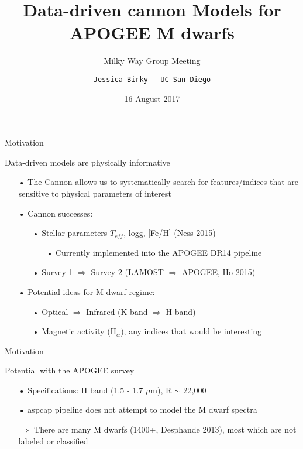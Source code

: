 \documentclass[compress]{beamer}
\title{Data-driven cannon Models for APOGEE M dwarfs}
\subtitle{\textcolor{sthlmDarkGreen}{Milky Way Group Meeting}}
\date{\small{16 August 2017}}
\author{\texttt{Jessica Birky - UC San Diego}}
\institute{\texttt{Advisor: David Hogg - NYU/MPIA/Simons}}
\begin{document}
\begin{frame}
	\titlepage
\end{frame}


\begin{frame}{Motivation}

\Large Data-driven models are physically informative
\begin{enumerate} \large
	\item[•] The Cannon allows us to systematically search for features/indices that are sensitive to physical parameters of interest
	\pause
	\item[•] Cannon successes:
	\begin{enumerate}
		\item[•] Stellar parameters $T_{eff}$, logg, [Fe/H] (Ness 2015)
		\begin{enumerate}
			\item[•] Currently implemented into the APOGEE DR14 pipeline
		\end{enumerate}
		\item[•] Survey 1 $\Rightarrow$ Survey 2 (LAMOST $\Rightarrow$ APOGEE, Ho 2015)
	\end{enumerate}
	\pause
	\item[•] Potential ideas for M dwarf regime:
	\begin{enumerate}
		\item[•] Optical $\Rightarrow$ Infrared (K band $\Rightarrow$ H band)
		\item[•] Magnetic activity (H$_{\alpha}$), any indices that would be interesting
	\end{enumerate}
\end{enumerate}

\end{frame}


\begin{frame}{Motivation}

\Large Potential with the \textcolor{sthlmDarkGreen}{APOGEE} survey
\begin{enumerate} \large
	\item[•] Specifications: H band (1.5 - 1.7 $\mu$m), R $\sim$ 22,000
	\item[•] aspcap pipeline does not attempt to model the M dwarf spectra
\end{enumerate}

\pause
\begin{enumerate} \large
	\item[$\Rightarrow$] There are many M dwarfs (1400+, Desphande 2013), most which are not labeled or classified
\end{enumerate}
\end{frame}
\end{document}

